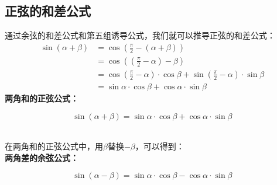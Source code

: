 \documentclass[UTF8]{ctexart}
\begin{document}
\subsection{正弦的和差公式}
    通过余弦的和差公式和第五组诱导公式，我们就可以推导正弦的和差公式：\\
    \setcounter{equation}{0}
    \begin{align}
        \sin{(\alpha+\beta)}
        &=\cos{\left(\frac{\pi}{2}-(\alpha+\beta)\right)}\qquad\qquad\qquad\qquad\\[3mm]
        &=\cos{\left(\left(\frac{\pi}{2}-\alpha\right)-\beta\right)}\\[3mm]
        &=\cos{(\frac{\pi}{2}-\alpha)}\cdot\cos{\beta}+\sin{(\frac{\pi}{2}-\alpha)}\cdot\sin{\beta}\\[3mm]
        &=\sin{\alpha}\cdot\cos{\beta}+\cos{\alpha}\cdot\sin{\beta}
    \end{align}
    \textbf{两角和的正弦公式：}
    \begin{large}
    \begin{equation*}
        \sin{(\alpha+\beta)}=\sin{\alpha}\cdot\cos{\beta}+\cos{\alpha}\cdot\sin{\beta}
    \end{equation*}\\        
    \end{large}
    在两角和的正弦公式中，用$\beta$替换$-\beta$，可以得到：\\
    \newline
    \textbf{两角差的余弦公式：}
    \begin{large}
    \begin{equation*}
        \sin{(\alpha-\beta)}=\sin{\alpha}\cdot\cos{\beta}-\cos{\alpha}\cdot\sin{\beta}
    \end{equation*}      
    \end{large}
\end{document}
